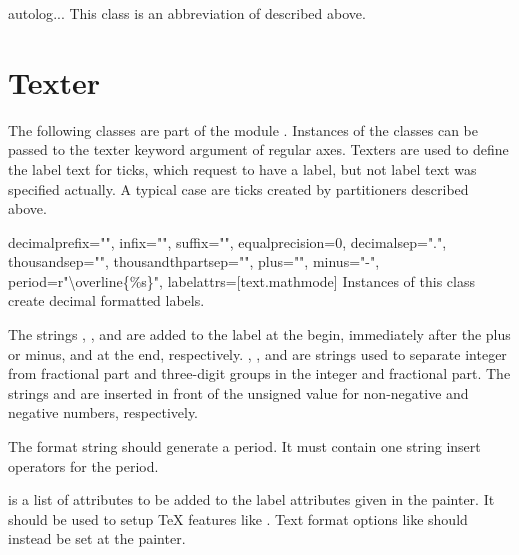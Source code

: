 \begin{classdesc}{autolog}{...}
This class is an abbreviation of  described above.
\end{classdesc}

\section{Texter}


The following classes are part of the module .
Instances of the classes can be passed to the texter keyword argument
of regular axes. Texters are used to define the label text for ticks,
which request to have a label, but not label text was specified
actually. A typical case are ticks created by partitioners described
above.

\begin{classdesc}{decimal}{prefix="", infix="", suffix="", equalprecision=0,
                           decimalsep=".", thousandsep="", thousandthpartsep="",
                           plus="", minus="-", period=r"\textbackslash overline\{\%s\}",
                           labelattrs=[text.mathmode]}
  Instances of this class create decimal formatted labels.

  The strings , , and  are added to
  the label at the begin, immediately after the plus or minus, and at
  the end, respectively. , , and
   are strings used to separate integer from
  fractional part and three-digit groups in the integer and fractional
  part. The strings  and  are inserted in front
  of the unsigned value for non-negative and negative numbers,
  respectively.

  The format string  should generate a period. It must
  contain one string insert operators  for the period.

   is a list of attributes to be added to the label
  attributes given in the painter. It should be used to setup TeX
  features like . Text format options like
   should instead be set at the painter.
\end{classdesc}

